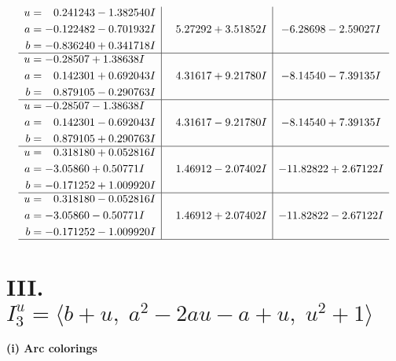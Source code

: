\documentclass[1p]{elsarticle_modified}
\theoremstyle{definition}
\begin{document}
$$\begin{array}{c|c|c}
\begin{aligned}
u &= \phantom{-}0.241243 - 1.382540 I \\
a &= -0.122482 - 0.701932 I \\
b &= -0.836240 + 0.341718 I\end{aligned}
 & \phantom{-}5.27292 + 3.51852 I & -6.28698 - 2.59027 I \\ \hline\begin{aligned}
u &= -0.28507 + 1.38638 I \\
a &= \phantom{-}0.142301 + 0.692043 I \\
b &= \phantom{-}0.879105 - 0.290763 I\end{aligned}
 & \phantom{-}4.31617 + 9.21780 I & -8.14540 - 7.39135 I \\ \hline\begin{aligned}
u &= -0.28507 - 1.38638 I \\
a &= \phantom{-}0.142301 - 0.692043 I \\
b &= \phantom{-}0.879105 + 0.290763 I\end{aligned}
 & \phantom{-}4.31617 - 9.21780 I & -8.14540 + 7.39135 I \\ \hline\begin{aligned}
u &= \phantom{-}0.318180 + 0.052816 I \\
a &= -3.05860 + 0.50771 I \\
b &= -0.171252 + 1.009920 I\end{aligned}
 & \phantom{-}1.46912 - 2.07402 I & -11.82822 + 2.67122 I \\ \hline\begin{aligned}
u &= \phantom{-}0.318180 - 0.052816 I \\
a &= -3.05860 - 0.50771 I \\
b &= -0.171252 - 1.009920 I\end{aligned}
 & \phantom{-}1.46912 + 2.07402 I & -11.82822 - 2.67122 I\\
 \hline 
 \end{array}$$\newpage\newpage\renewcommand{\arraystretch}{1}
\centering \section*{III. $I^u_{3}= \langle b+u,\;a^2-2 a u- a+u,\;u^2+1 \rangle$}
\flushleft \textbf{(i) Arc colorings}\\
\end{document}

